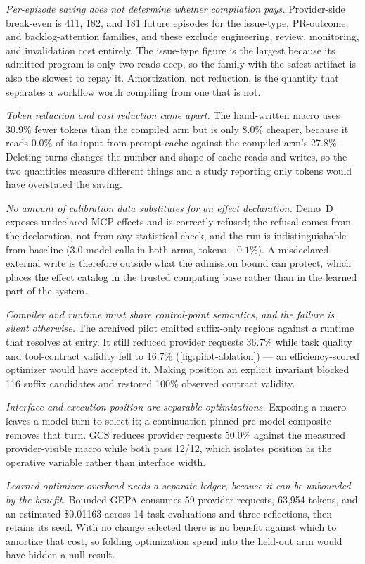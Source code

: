 \emph{Per-episode saving does not determine whether compilation pays.} Provider-side
break-even is 411, 182, and 181 future episodes for the issue-type, PR-outcome, and
backlog-attention families, and these exclude engineering, review, monitoring, and
invalidation cost entirely.  The issue-type figure is the largest because its admitted
program is only two reads deep, so the family with the safest artifact is also the slowest
to repay it.  Amortization, not reduction, is the quantity that separates a workflow worth
compiling from one that is not.

\emph{Token reduction and cost reduction came apart.} The hand-written macro uses 30.9\%
fewer tokens than the compiled arm but is only 8.0\% cheaper, because it reads 0.0\% of
its input from prompt cache against the compiled arm's 27.8\%.  Deleting turns changes the
number and shape of cache reads and writes, so the two quantities measure different things
and a study reporting only tokens would have overstated the saving.

\emph{No amount of calibration data substitutes for an effect declaration.} Demo~D exposes
undeclared MCP effects and is correctly refused; the refusal comes from the declaration,
not from any statistical check, and the run is indistinguishable from baseline (3.0 model
calls in both arms, tokens $+0.1\%$).  A misdeclared external write is therefore outside
what the admission bound can protect, which places the effect catalog in the trusted
computing base rather than in the learned part of the system.

\emph{Compiler and runtime must share control-point semantics, and the failure is silent
otherwise.} The archived pilot emitted suffix-only regions against a runtime that resolves
at entry.  It still reduced provider requests 36.7\% while task quality and tool-contract
validity fell to 16.7\% (\cref{fig:pilot-ablation}) --- an efficiency-scored optimizer
would have accepted it.  Making position an explicit invariant blocked 116 suffix
candidates and restored 100\% observed contract validity.

\emph{Interface and execution position are separable optimizations.} Exposing a macro
leaves a model turn to select it; a continuation-pinned pre-model composite removes that
turn.  GCS reduces provider requests 50.0\% against the measured provider-visible macro
while both pass 12/12, which isolates position as the operative variable rather than
interface width.

\emph{Learned-optimizer overhead needs a separate ledger, because it can be unbounded by
the benefit.} Bounded GEPA consumes 59 provider requests, 63,954 tokens, and an estimated
\$0.01163 across 14 task evaluations and three reflections, then retains its seed.  With no
change selected there is no benefit against which to amortize that cost, so folding
optimization spend into the held-out arm would have hidden a null result.

